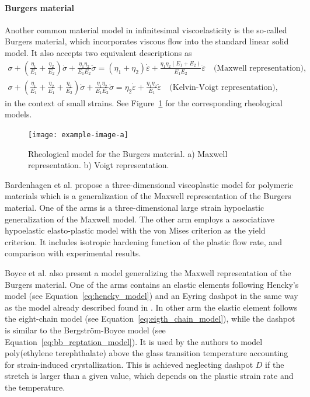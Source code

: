 \paragraph{Burgers material}
Another common material model in infinitesimal viscoelasticity is the so-called Burgers material, which incorporates viscous flow into the standard linear solid model.
It also accepts two equivalent descriptions as
\begin{gather}
	\sigma+\left(\frac{\eta_1}{E_1}+\frac{\eta_2}{E_2}\right) \dot{\sigma}+\frac{\eta_1 \eta_2}{E_1 E_2} \ddot{\sigma}=\left(\eta_1+\eta_2\right) \dot{\varepsilon}+\frac{\eta_1 \eta_2\left(E_1+E_2\right)}{E_1 E_2} \ddot{\varepsilon}\quad \text{(Maxwell representation)},\\
	\sigma+\left(\frac{\eta_1}{E_1}+\frac{\eta_2}{E_1}+\frac{\eta_2}{E_2}\right) \dot{\sigma}+\frac{\eta_1 \eta_2}{E_1 E_2} \ddot{\sigma}=\eta_2 \dot{\varepsilon}+\frac{\eta_1 \eta_2}{E_1} \ddot{\varepsilon}\quad \text{(Kelvin-Voigt representation)},
\end{gather}
in the context of small strains.
See Figure~\ref{fig:rheo_model_burgers} for the corresponding rheological models.
\begin{figure}
  \centering
  \texttt{[image: example-image-a]}
  \caption{Rheological model for the Burgers material. a) Maxwell representation. b) Voigt representation.}
  \label{fig:rheo_model_burgers}
\end{figure}

Bardenhagen et al. \citep{bardenhagenThreedimensionalFiniteDeformation1997} propose a three-dimensional viscoplastic model for polymeric materials which is a generalization of the Maxwell representation of the Burgers material.
One of the arms is a three-dimensional large strain hypoelastic generalization of the Maxwell model.
The other arm employs a associatiave hypoelastic elasto-plastic model with the von Mises criterion as the yield criterion.
It includes isotropic hardening function of the plastic flow rate, and comparison with experimental results.

Boyce et al. \citep{boyceConstitutiveModelFinite2000} also present a model generalizing the Maxwell representation of the Burgers material.
One of the arms contains an elastic elements following Hencky's model (see Equation~\eqref{eq:hencky_model}) and an Eyring dashpot in the same way as the model already described found in \citep{boyceLargeInelasticDeformation1988}.
In other arm the elastic element follows the eight-chain model (see Equation~\eqref{eq:eigth_chain_model}), while the dashpot is similar to the Bergström-Boyce model (see Equation~\eqref{eq:bb_reptation_model}).
It is used by the authors to model poly(ethylene terephthalate) above the glass transition temperature accounting for strain-induced crystallization.
This is achieved neglecting dashpot $D$ if the stretch is larger than a given value, which depends on the plastic strain rate and the temperature.

